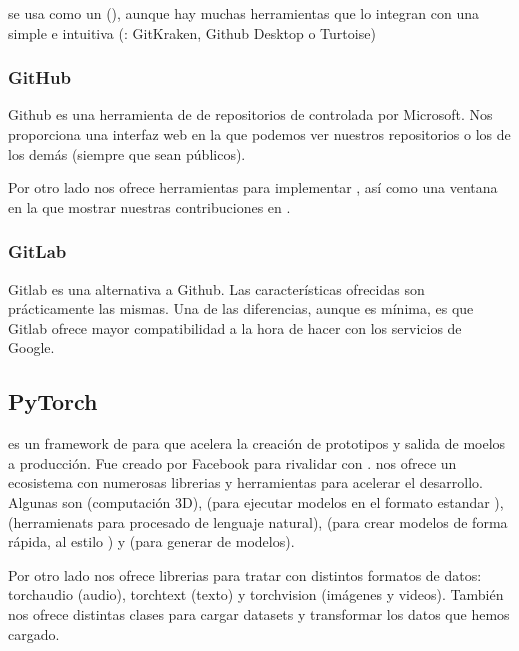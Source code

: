  se usa como un  (), aunque hay muchas herramientas que lo integran con una  simple e intuitiva (\pe: GitKraken, Github Desktop o Turtoise)

\subsubsection{GitHub}

Github es una herramienta de  de repositorios de  controlada por Microsoft. Nos proporciona una interfaz web en la que podemos ver nuestros repositorios o los de los demás (siempre que sean públicos).

Por otro lado nos ofrece herramientas para implementar , así como una ventana en la que mostrar nuestras contribuciones en .


\subsubsection{GitLab}

Gitlab es una alternativa a Github. Las características ofrecidas son prácticamente las mismas. Una de las diferencias, aunque es mínima, es que Gitlab ofrece mayor compatibilidad a la hora de hacer  con los servicios de Google.


\subsection{PyTorch}

 es un framework de  para  que acelera la creación de prototipos y salida de moelos a producción. Fue creado por Facebook para rivalidar con .  nos ofrece un ecosistema con numerosas librerias y herramientas para acelerar el desarrollo. Algunas son  (computación 3D),  (para ejecutar modelos en el formato estandar ),  (herramienats para procesado de lenguaje natural),  (para crear modelos de forma rápida, al estilo ) y  (para generar  de modelos).

Por otro lado nos ofrece librerias para tratar con distintos formatos de datos: torchaudio (audio), torchtext (texto) y torchvision (imágenes y videos). También nos ofrece distintas clases para cargar datasets  y transformar los datos que hemos cargado.

